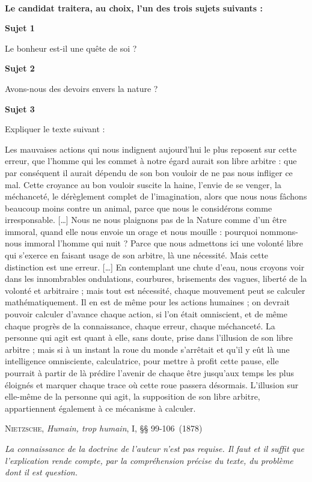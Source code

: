 \documentclass[12pt]{article}
\author{}
\title{\titre
\\[0.5em]
\normalsize{\nomEnseignant}\\
\small{\classes}}
\date{}
\newcommand{\sujetA}{Le bonheur est-il une quête de soi ?}
\newcommand{\sujetB}{Avons-nous des devoirs envers la nature ?}
\newcommand{\sujetC}{Les mauvaises actions qui nous indignent aujourd’hui le plus reposent sur cette erreur, que l’homme qui les commet à notre égard aurait son libre arbitre : que par conséquent il aurait dépendu de son bon vouloir de ne pas nous infliger ce mal. Cette croyance au bon vouloir suscite la haine, l’envie de se venger, la méchanceté, le dérèglement complet de l’imagination, alors que nous nous fâchons beaucoup moins contre un animal, parce que nous le considérons comme irresponsable. […] Nous ne nous plaignons pas de la Nature comme d’un être immoral, quand elle nous envoie un orage et nous mouille : pourquoi nommons-nous immoral l’homme qui nuit ? Parce que nous admettons ici une volonté libre qui s’exerce en faisant usage de son arbitre, là une nécessité. Mais cette distinction est une erreur. […] En contemplant une chute d’eau, nous croyons voir dans les innombrables ondulations, courbures, brisements des vagues, liberté de la volonté et arbitraire ; mais tout est nécessité, chaque mouvement peut se calculer mathématiquement. Il en est de même pour les actions humaines ; on devrait pouvoir calculer d’avance chaque action, si l’on était omniscient, et de même chaque progrès de la connaissance, chaque erreur, chaque méchanceté. La personne qui agit est quant à elle, sans doute, prise dans l’illusion de son libre arbitre ; mais si à un instant la roue du monde s’arrêtait et qu’il y eût là une intelligence omnisciente, calculatrice, pour mettre à profit cette pause, elle pourrait à partir de là prédire l’avenir de chaque être jusqu’aux temps les plus éloignés et marquer chaque trace où cette roue passera désormais. L’illusion sur elle-même de la personne qui agit, la supposition de son libre arbitre, appartiennent également à ce mécanisme à calculer.}
\newcommand{\auteur}{Nietzsche}
\newcommand{\titreLivre}{Humain, trop humain}
\newcommand{\precisionsReference}{, I, §§ 99-106}
\newcommand{\dateReference}{1878}
\begin{document}
\maketitle 
\vspace{-1.3cm}

\begin{center}
\textbf{Le candidat traitera, au choix, l’un des trois sujets suivants :}
\end{center}
\vspace{0.3cm}

\bigskip \noindent \textbf{Sujet 1}

\indent
\sujetA

\bigskip \noindent \textbf{Sujet 2}

\indent
\sujetB

\bigskip \noindent \textbf{Sujet 3}

\indent 
Expliquer le texte suivant :

\leftskip=1.1cm
\medskip \noindent
\begin{linenumbers}
\sujetC
\end{linenumbers}

\begin{flushright}
\textsc{\auteur}, \textit{\titreLivre}\precisionsReference (\dateReference)
\end{flushright}

\leftskip=0cm
\vspace{0.8cm} \noindent
\textit{La connaissance de la doctrine de l’auteur n’est pas requise. Il faut et il suffit que
l’explication rende compte, par la compréhension précise du texte, du problème dont
il est question.}
\end{document}
